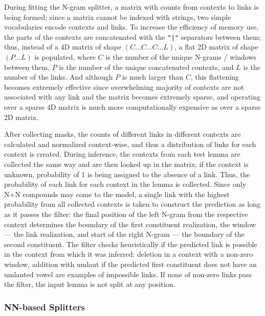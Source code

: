 \documentclass[11pt]{article}
\begin{document}
During fitting the N-gram splitter, a matrix with counts from contexts to links is being formed; since a matrix cannot be indexed with strings, two simple vocabularies encode contexts and links. To increase the efficiency of memory use, the parts of the contexts are concatenated with the \texttt{"|"} separators between them; thus, instead of a 4D matrix of shape $(C ... C ... C ... L)$, a flat 2D matrix of shape $(P ... L)$ is populated, where $C$ is the number of the unique N-grams / windows between them, $P$ is the number of the unique concatenated contexts, and $L$ is the number of the links. And although $P$ is much larger than $C$, this flattening becomes extremely effective since overwhelming majority of contexts are not associated with any link and the matrix becomes extremely sparse, and operating over a sparse 4D matrix is much more computationally expensive as over a sparse 2D matrix.

After collecting masks, the counts of different links in different contexts are calculated and normalized context-wise, and thus a distribution of links for each context is created. During inference, the contexts from each test lemma are collected the same way and are then looked up in the matrix; if the context is unknown, probability of 1 is being assigned to the absence of a link. Thus, the probability of each link for each context in the lemma is collected. Since only N+N compounds may come to the model, a single link with the highest probability from all collected contexts is taken to construct the prediction as long as it passes the filter: the final position of the left N-gram from the respective context determines the boundary of the first constituent realization, the window --- the link realization, and start of the right N-gram --- the boundary of the second constituent. The filter checks heuristically if the predicted link is possible in the context from which it was inferred: deletion in a context with a non-zero window, addition with umlaut if the predicted first constituent does not have an umlauted vowel are examples of impossible links. If none of non-zero links pass the filter, the input lemma is not split at any position.


\subsubsection{NN-based Splitters}
\end{document}
